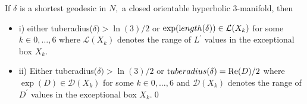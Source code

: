 \begin{corollary}\label{GMT 1.29}
If $\delta$ is a shortest geodesic in $N,$ a closed orientable
hyperbolic $3$\/{\textrm -}\/manifold{\textrm ,} then 
\begin{itemize}
\item{i)}  either {\textrm tuberadius(}$\delta) > \ln(3)/2$ or
$\exp({\textrm length}(\delta))\in \mathcal {L}(X_k)$ for some\break $k\in {0,\ldots,6}$
 where $\mathcal {L}(X_k)$
denotes the range of $L^\prime$ values in the 
exceptional box $X_k.$ 

\item{ii)} Either {\textrm tuberadius(}$\delta) > \ln(3)/2$ or
${\textrm tuberadius}(\delta) = \mathrm {Re}(D)/2$ where\break $\exp(D)
\in \mathcal {D}(X_k)$ for some $k\in {0,\ldots,6}$
 and $\mathcal {D}(X_k)$
denotes the range of $D^\prime$ values in the 
exceptional box $X_k.$\hfill\qed
\end{itemize}

\end{corollary}

